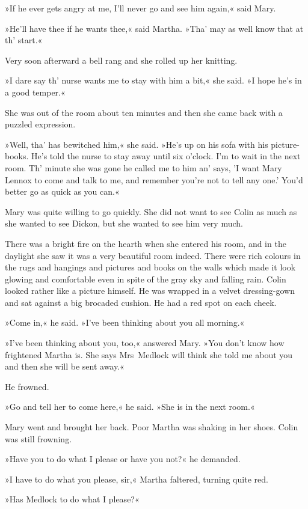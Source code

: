 »If he ever gets angry at me, I'll never go and see him again,« said Mary.

»He'll have thee if he wants thee,« said Martha. »Tha' may as well know that at th' start.«

Very soon afterward a bell rang and she rolled up her knitting.

»I dare say th' nurse wants me to stay with him a bit,« she said. »I hope he's in a good temper.«

She was out of the room about ten minutes and then she came back with a puzzled expression.

»Well, tha' has bewitched him,« she said. »He's up on his sofa with his picture-books. He's told the nurse to stay away until six o'clock. I'm to wait in the next room. Th' minute she was gone he called me to him an' says, 'I want Mary Lennox to come and talk to me, and remember you're not to tell any one.' You'd better go as quick as you can.«

Mary was quite willing to go quickly. She did not want to see Colin as much as she wanted to see Dickon, but she wanted to see him very much.

There was a bright fire on the hearth when she entered his room, and in the daylight she saw it was a very beautiful room indeed. There were rich colours in the rugs and hangings and pictures and books on the walls which made it look glowing and comfortable even in spite of the gray sky and falling rain. Colin looked rather like a picture himself. He was wrapped in a velvet dressing-gown and sat against a big brocaded cushion. He had a red spot on each cheek.

»Come in,« he said. »I've been thinking about you all morning.«

»I've been thinking about you, too,« answered Mary. »You don't know how frightened Martha is. She says Mrs~Medlock will think she told me about you and then she will be sent away.«

He frowned.

»Go and tell her to come here,« he said. »She is in the next room.«

Mary went and brought her back. Poor Martha was shaking in her shoes. Colin was still frowning.

»Have you to do what I please or have you not?« he demanded.

»I have to do what you please, sir,« Martha faltered, turning quite red.

»Has Medlock to do what I please?«

